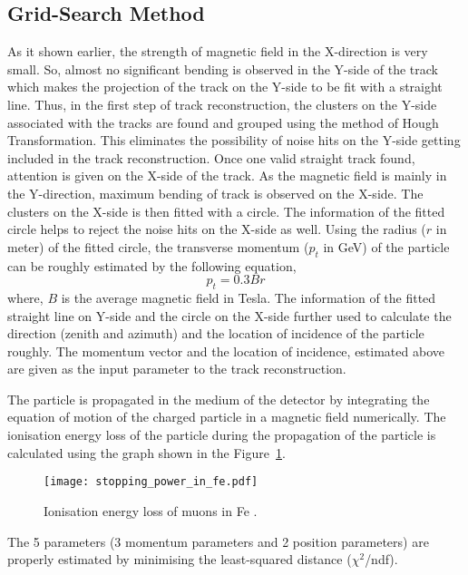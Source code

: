 \subsection{Grid-Search Method}
As it shown earlier, the strength of magnetic field in the
X-direction is very small. So, almost no significant bending is
observed in the Y-side of the track which makes the projection of
the track on the Y-side to be fit with a straight line.
Thus, in the first step of track reconstruction, the clusters on
the Y-side associated with the tracks are found and grouped using
the method of Hough Transformation\cite{hought}. This eliminates
the possibility of noise hits on the Y-side getting included in the
track reconstruction. Once one valid straight track found, attention
is given on the X-side of the track. As the magnetic field is mainly
in the Y-direction, maximum bending of track is observed on the X-side.
The clusters on the X-side is then fitted with a circle.
The information of the fitted circle helps to reject the noise hits
on the X-side as well.
Using the radius ($r$ in meter) of the fitted circle, the transverse
momentum ($p_t$ in GeV) of the particle can be roughly estimated by
the following equation,
\begin{equation}
  p_{t}=0.3Br \label{eq:pt_est}
\end{equation}
where, $B$ is the average magnetic field in Tesla.
The information of the fitted straight line on Y-side and the circle
on the X-side further used to calculate the direction (zenith and
azimuth) and the location of incidence of the particle roughly.
The momentum vector and the location of incidence, estimated
above are given as the input parameter to the track reconstruction.

The particle is propagated in the medium of the detector by integrating
the equation of motion of the charged particle in a magnetic field
numerically. The ionisation energy loss of the particle during the
propagation of the particle is calculated using the graph shown in the
Figure~\ref{fig:eloss}.
\begin{figure}[h]
  \centering
  \texttt{[image: stopping\_power\_in\_fe.pdf]}
  \caption{Ionisation energy loss of muons in Fe \cite{pdgspectra1,bethe1}.}
  \label{fig:eloss}
\end{figure}

The 5 parameters (3 momentum parameters and 2 position parameters) are
properly estimated by minimising the least-squared distance
($\chi^{2}$/ndf).

